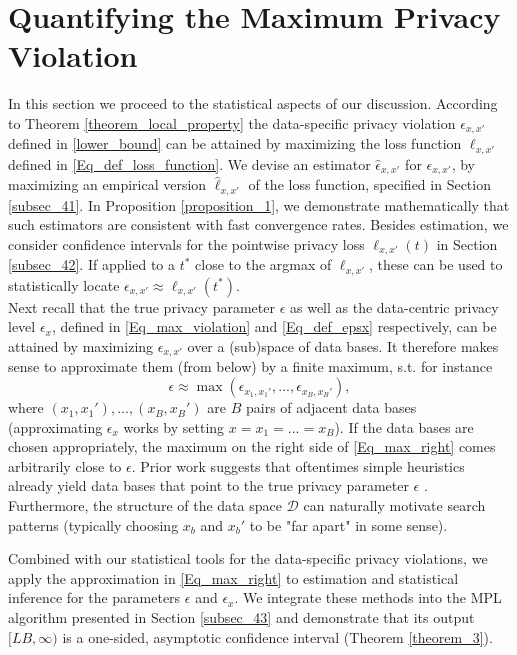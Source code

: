 \documentclass[conference]{IEEEtran}
\begin{document}
$ $\\[-6ex]


\section{Quantifying the Maximum Privacy Violation} \label{Sec_4}
In this section we proceed to the statistical aspects of our discussion.
According to Theorem \ref{theorem_local_property} the data-specific privacy 
violation $\epsilon_{x,x'}$ defined in \eqref{lower_bound} can be attained by
maximizing the loss function $\ell_{x,x'}$ defined in \eqref{Eq_def_loss_function}. 
We devise an estimator $\hat \epsilon_{x,x'}$ for  $\epsilon_{x,x'}$, 
by maximizing an empirical version $\hat \ell_{x,x'}$ of the loss function, specified in Section \ref{subsec_41}.
In Proposition \ref{proposition_1}, we demonstrate mathematically that such estimators are consistent with fast convergence rates. Besides estimation, we consider confidence intervals for the pointwise privacy loss $\ell_{x,x'}(t)$ in Section \ref{subsec_42}. If applied to a $t^*$ close to the argmax of $\ell_{x,x'}$, these can be used to statistically locate $\epsilon_{x,x'}\approx \ell_{x,x'}(t^*)$.\\
Next recall that the true privacy parameter $\epsilon$ as well as the data-centric privacy level $\epsilon_x$, defined in \eqref{Eq_max_violation} and \eqref{Eq_def_epsx} respectively, can
be attained by maximizing $\epsilon_{x,x'}$ over a (sub)space of data bases. It therefore makes sense
to approximate them (from below) by a finite maximum, s.t. for instance
\begin{equation}\label{Eq_max_right}
\epsilon \approx  \max (\epsilon_{x_1, x_1'},..., \epsilon_{x_B, x_B'}),
\end{equation}
where $(x_1, x_1'),...,(x_B, x_B')$ are $B$ pairs of adjacent data bases (approximating $\epsilon_x$ works by setting $x=x_1=...=x_B$). If the data bases are chosen appropriately, the maximum on the right side of \eqref{Eq_max_right} comes arbitrarily close to $\epsilon$. Prior work suggests that oftentimes simple heuristics already yield data bases that point to the true privacy parameter $\epsilon$ \cite{StatDP}. 
Furthermore, the structure of the data space $\mathcal{D}$ can naturally motivate search patterns (typically choosing $x_b$ and $x_b'$ to be "far apart" in some sense).

Combined with our statistical tools for the data-specific privacy violations, we  apply the approximation in \eqref{Eq_max_right} to estimation and statistical inference for the parameters $\epsilon$ and $\epsilon_x$. We integrate these methods into the MPL algorithm presented in Section \ref{subsec_43} and demonstrate that its output $[LB, \infty)$ is a one-sided, asymptotic confidence interval (Theorem \ref{theorem_3}).
\end{document}
